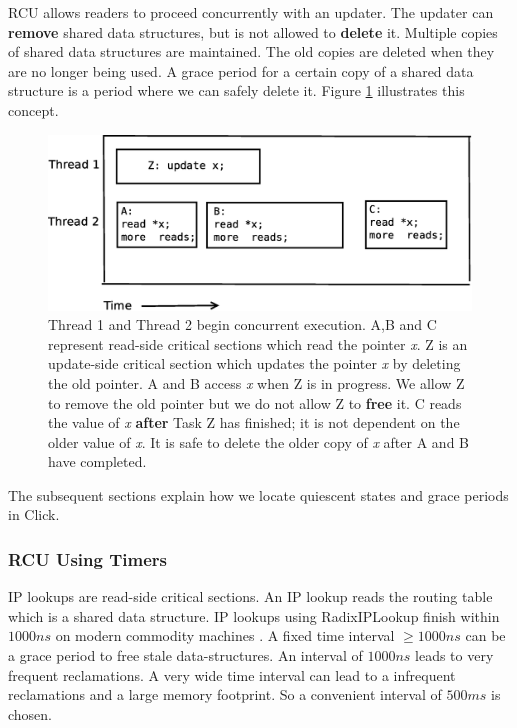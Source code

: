 \documentclass[a4paper,marginparwidth=50pt,marginparsep=10pt]{article}
\begin{document}
RCU allows readers to proceed concurrently with an updater. The updater can \textbf{remove} shared data structures, but is not allowed to \textbf{delete} it. Multiple copies of shared data structures are maintained. The old copies are deleted when they are no longer being used. A grace period for a certain copy of a shared data structure is a period where we can safely delete it. Figure \ref{fig:rcuexp1} illustrates this concept.

\begin{figure}[float=tph]
\begin{center}
\includegraphics[scale=0.4]{../images/diagrams/rcuexp0}
\caption{Thread 1 and Thread 2 begin concurrent execution. A,B and C represent read-side critical sections which read the pointer \emph{x}. Z is an update-side critical section which updates the pointer \emph{x} by deleting the old pointer. A and B access \emph{x} when Z is in progress. We allow Z to remove the old pointer but we do not allow Z to \textbf{free} it. C reads the value of \emph{x} \textbf{after} Task Z has finished; it is not dependent on the older value of \emph{x}. It is safe to delete the older copy of \emph{x} after A and B have completed.}
\label{fig:rcuexp1} 
\end{center}
\end{figure}

The subsequent sections explain how we locate quiescent states and grace periods in Click.
\subsubsection{RCU Using Timers}
\label{sec:rcutimers}
IP lookups are read-side critical sections. An IP lookup reads the routing table which is a shared data structure. IP lookups using RadixIPLookup finish within $1000 ns$ on modern commodity machines \cite{lookuptime}. A fixed time interval $\ge 1000 ns$ can be a grace period to free stale data-structures. An interval of $1000 ns$ leads to very frequent reclamations. A very wide time interval can lead to a infrequent reclamations and a large memory footprint. So a convenient interval of $500ms$ is chosen.\\ 
\end{document}
